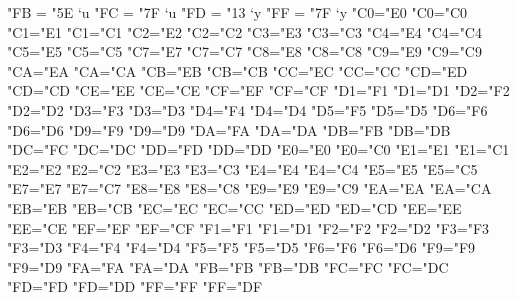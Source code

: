 \charsubdef "FB = "5E `u		%
\charsubdef "FC = "7F `u		%
\charsubdef "FD = "13 `y		%
\charsubdef "FF = "7F `y		%
\lccode"C0="E0 \uccode"C0="C0	%
\lccode"C1="E1 \uccode"C1="C1	%
\lccode"C2="E2 \uccode"C2="C2	%
\lccode"C3="E3 \uccode"C3="C3	%
\lccode"C4="E4 \uccode"C4="C4	%
\lccode"C5="E5 \uccode"C5="C5	%
\lccode"C7="E7 \uccode"C7="C7	%
\lccode"C8="E8 \uccode"C8="C8	%
\lccode"C9="E9 \uccode"C9="C9	%
\lccode"CA="EA \uccode"CA="CA	%
\lccode"CB="EB \uccode"CB="CB	%
\lccode"CC="EC \uccode"CC="CC	%
\lccode"CD="ED \uccode"CD="CD	%
\lccode"CE="EE \uccode"CE="CE	%
\lccode"CF="EF \uccode"CF="CF	%
\lccode"D1="F1 \uccode"D1="D1	%
\lccode"D2="F2 \uccode"D2="D2	%
\lccode"D3="F3 \uccode"D3="D3	%
\lccode"D4="F4 \uccode"D4="D4	%
\lccode"D5="F5 \uccode"D5="D5	%
\lccode"D6="F6 \uccode"D6="D6	%
\lccode"D9="F9 \uccode"D9="D9	%
\lccode"DA="FA \uccode"DA="DA	%
\lccode"DB="FB \uccode"DB="DB	%
\lccode"DC="FC \uccode"DC="DC	%
\lccode"DD="FD \uccode"DD="DD	%
\lccode"E0="E0 \uccode"E0="C0	%
\lccode"E1="E1 \uccode"E1="C1	%
\lccode"E2="E2 \uccode"E2="C2	%
\lccode"E3="E3 \uccode"E3="C3	%
\lccode"E4="E4 \uccode"E4="C4	%
\lccode"E5="E5 \uccode"E5="C5	%
\lccode"E7="E7 \uccode"E7="C7	%
\lccode"E8="E8 \uccode"E8="C8	%
\lccode"E9="E9 \uccode"E9="C9	%
\lccode"EA="EA \uccode"EA="CA	%
\lccode"EB="EB \uccode"EB="CB	%
\lccode"EC="EC \uccode"EC="CC	%
\lccode"ED="ED \uccode"ED="CD	%
\lccode"EE="EE \uccode"EE="CE	%
\lccode"EF="EF \uccode"EF="CF	%
\lccode"F1="F1 \uccode"F1="D1	%
\lccode"F2="F2 \uccode"F2="D2	%
\lccode"F3="F3 \uccode"F3="D3	%
\lccode"F4="F4 \uccode"F4="D4	%
\lccode"F5="F5 \uccode"F5="D5	%
\lccode"F6="F6 \uccode"F6="D6	%
\lccode"F9="F9 \uccode"F9="D9	%
\lccode"FA="FA \uccode"FA="DA	%
\lccode"FB="FB \uccode"FB="DB	%
\lccode"FC="FC \uccode"FC="DC	%
\lccode"FD="FD \uccode"FD="DD	%
\lccode"FF="FF \uccode"FF="DF	%

